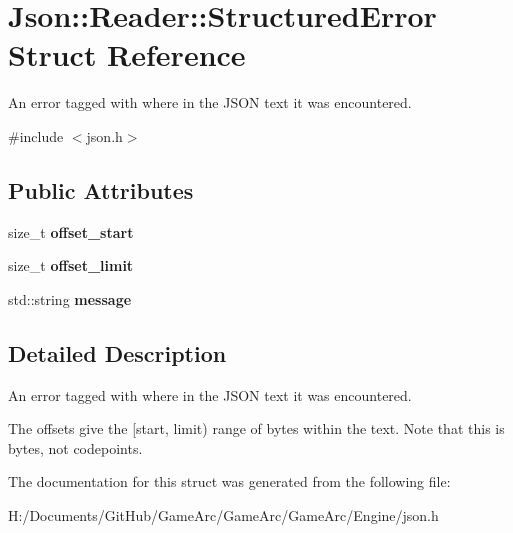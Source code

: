 \hypertarget{struct_json_1_1_reader_1_1_structured_error}{\section{Json\+:\+:Reader\+:\+:Structured\+Error Struct Reference}
\label{struct_json_1_1_reader_1_1_structured_error}
}


An error tagged with where in the J\+S\+O\+N text it was encountered.  




{\ttfamily \#include $<$json.\+h$>$}

\subsection*{Public Attributes}
\begin{DoxyCompactItemize}
\item 
\hypertarget{struct_json_1_1_reader_1_1_structured_error_a160dae4eb3464a2209b743c755baf65f}{size\+\_\+t {\bfseries offset\+\_\+start}}\label{struct_json_1_1_reader_1_1_structured_error_a160dae4eb3464a2209b743c755baf65f}

\item 
\hypertarget{struct_json_1_1_reader_1_1_structured_error_a80747dae744bcc80a9bc81c94fd42e13}{size\+\_\+t {\bfseries offset\+\_\+limit}}\label{struct_json_1_1_reader_1_1_structured_error_a80747dae744bcc80a9bc81c94fd42e13}

\item 
\hypertarget{struct_json_1_1_reader_1_1_structured_error_ab8755e5201b78c6ae077338f8819e6e6}{std\+::string {\bfseries message}}\label{struct_json_1_1_reader_1_1_structured_error_ab8755e5201b78c6ae077338f8819e6e6}

\end{DoxyCompactItemize}


\subsection{Detailed Description}
An error tagged with where in the J\+S\+O\+N text it was encountered. 

The offsets give the \mbox{[}start, limit) range of bytes within the text. Note that this is bytes, not codepoints. 

The documentation for this struct was generated from the following file\+:\begin{DoxyCompactItemize}
\item 
H\+:/\+Documents/\+Git\+Hub/\+Game\+Arc/\+Game\+Arc/\+Game\+Arc/\+Engine/json.\+h\end{DoxyCompactItemize}
